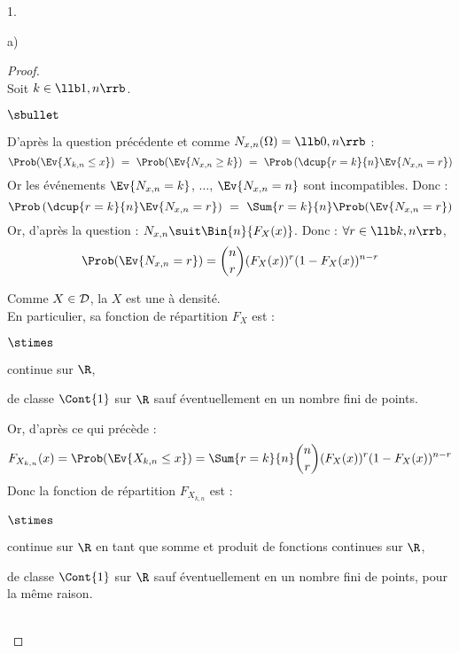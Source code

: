 \documentclass[11pt]{article}%
\begin{document}
\begin{noliste}{1.}
\begin{noliste}{a)}
    \begin{proof}~\\
    Soit $k \in \llb 1,n \rrb$.
    \begin{noliste}{$\sbullet$}
      \item D'après la question précédente et comme $N_{x,n}(\Omega)
      =\llb 0,n \rrb$ :
      \[
        \Prob(\Ev{X_{k,n} \leq x}) \ = \ \Prob(\Ev{N_{x,n}\geq k})
        \ = \ \Prob\left( \dcup{r=k}{n} \Ev{N_{x,n}=r}\right)
      \]
      Or les événements $\Ev{N_{x,n}=k}$, $\ldots$, 
      $\Ev{N_{x,n}=n}$ sont incompatibles. Donc :
      \[
        \Prob\left(\dcup{r=k}{n} \Ev{N_{x,n}=r}\right) 
        \ = \ \Sum{r=k}{n} \Prob(\Ev{N_{x,n}=r})
      \]
      Or, d'après la question  : $N_{x,n} \suit 
      \Bin{n}{F_X(x)}$. Donc : $\forall r \in \llb k,n \rrb$,
      \[
        \Prob(\Ev{N_{x,n}=r}) = \dbinom{n}{r} (F_X(x))^r
        (1-F_X(x))^{n-r}
      \]
      
      \item Comme $X \in {\cal D}$, la \var $X$ est une \var à 
      densité.\\
      En particulier, sa fonction de répartition $F_X$ est :
      \begin{noliste}{$\stimes$}
	\item continue sur $\R$,
	\item de classe $\Cont{1}$ sur $\R$ sauf éventuellement 
	en un nombre fini de points.
      \end{noliste}
      Or, d'après ce qui précède :
      \[
        F_{X_{k,n}}(x) = \Prob(\Ev{X_{k,n} \leq x})
        = \Sum{r=k}{n} \dbinom{n}{r} (F_X(x))^r 
        (1-F_X(x))^{n-r}
      \]
      Donc la fonction de répartition $F_{X_{k,n}}$ est :
      \begin{noliste}{$\stimes$}
	\item continue sur $\R$ en tant que somme et 
	produit de fonctions continues sur $\R$,
	\item de classe $\Cont{1}$ sur $\R$ sauf éventuellement
	en un nombre fini de points, pour la même raison.
      \end{noliste}
    \end{noliste}
    
    ~\\[-1.4cm]
    \end{proof}
  \end{noliste}


\end{noliste}
\end{document}
